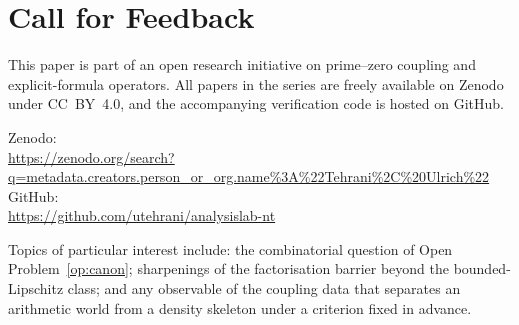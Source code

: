 \documentclass[11pt]{article}
\begin{document}
\section*{Call for Feedback}

This paper is part of an open research initiative on prime--zero
coupling and explicit-formula operators.
All papers in the series are freely available on Zenodo under CC~BY~4.0, and
the accompanying verification code is hosted on GitHub.

{\raggedright
Zenodo:\\
\url{https://zenodo.org/search?q=metadata.creators.person_or_org.name\%3A\%22Tehrani\%2C\%20Ulrich\%22}\\
GitHub:\\
\url{https://github.com/utehrani/analysislab-nt}
\par}

Topics of particular interest include: the combinatorial question of
Open Problem~\ref{op:canon}; sharpenings of the factorisation barrier beyond
the bounded-Lipschitz class; and any observable of the coupling data that
separates an arithmetic world from a density skeleton under a criterion fixed
in advance.
\end{document}
